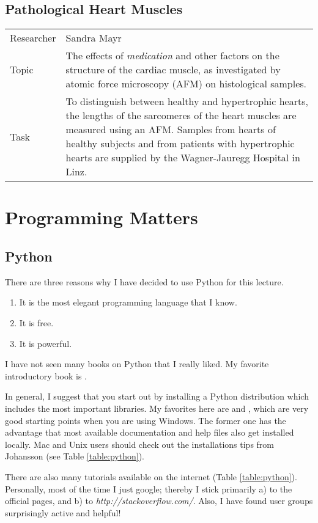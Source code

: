 \subsection{ Pathological Heart Muscles }
\begin{tabular}{ l p{12cm} }
    Researcher & Sandra Mayr \\
    Topic &  The effects of \emph{medication} and other factors on the structure of the cardiac muscle, as investigated by atomic force microscopy (AFM) on histological samples.\\
    Task & To distinguish between healthy and hypertrophic hearts, the lengths of the sarcomeres of the heart muscles are measured using an AFM. Samples from hearts of healthy subjects and from patients with hypertrophic hearts are supplied by the Wagner-Jauregg Hospital in Linz.
\end{tabular}

\section{Programming Matters}

\subsection{Python}
There are three reasons why I have decided to use Python for this lecture.

\begin{enumerate}
  \item It is the most elegant programming language that I know.
  \item It is free.
  \item It is powerful.
\end{enumerate}

I have not seen many books on Python that I really liked. My favorite introductory book is \cite{Harms2010}.

In general, I suggest that you start out by installing a Python distribution which includes the most important libraries. My favorites here are \cite{pythonxy} and \cite{winpython}, which are very good starting points when you are using Windows. The former one has the advantage that most available documentation and help files also get installed locally. Mac and Unix users should check out the installations tips from Johansson (see Table \ref{table:python}).

There are also many tutorials available on the internet (Table \ref{table:python}). Personally, most of the time I just google; thereby I stick primarily a) to the official pages, and b) to \emph{http://stackoverflow.com/}. Also, I have found user groups surprisingly active and helpful!

